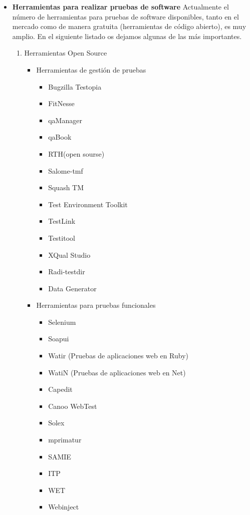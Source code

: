 \documentclass[12pt,a4paper,oneside]{book}
\begin{document}
\begin{enumerate}
\begin{itemize}
\begin{itemize}
						\end{itemize}
				
				
				\item \textbf{Herramientas para realizar pruebas de software }
					Actualmente el número de herramientas para pruebas de software disponibles, tanto en el mercado como de manera gratuita (herramientas de código abierto), es muy amplio. En el siguiente listado os dejamos algunas de las más importantes.
					\begin{enumerate}
						\item Herramientas Open Source
							\begin{itemize}
								\item Herramientas de gestión de pruebas
								\begin{itemize}
									\item Bugzilla Testopia
									\item FitNesse
									\item qaManager
									\item qaBook
									\item RTH(open sourse)
									\item Salome-tmf
									\item Squash TM
									\item Test Environment Toolkit
									\item TestLink
									\item Testitool
									\item XQual Studio
									\item Radi-testdir
									\item Data Generator
									
								\end{itemize}
								
								\item Herramientas para pruebas funcionales
									\begin{itemize}
										\item Selenium
										\item Soapui
										\item Watir (Pruebas de aplicaciones web en Ruby)
										\item WatiN (Pruebas de aplicaciones web en Net)
										\item Capedit
										\item Canoo WebTest
										\item Solex
										\item mprimatur
										\item SAMIE
										\item ITP
										\item WET
										\item Webinject
										

\end{itemize}
\end{itemize}
\end{enumerate}
\end{itemize}
\end{enumerate}
\end{document}

